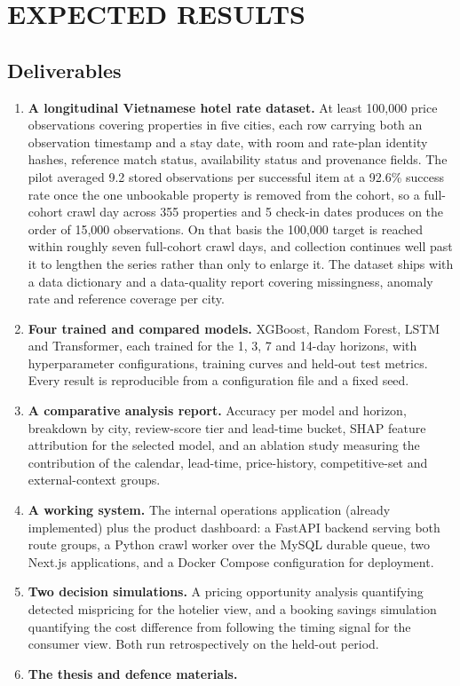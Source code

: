 \chapter{EXPECTED RESULTS}

\section{Deliverables}

\begin{enumerate}[leftmargin=*]
    \item \textbf{A longitudinal Vietnamese hotel rate dataset.} At least 100,000 price observations covering properties in five cities, each row carrying both an observation timestamp and a stay date, with room and rate-plan identity hashes, reference match status, availability status and provenance fields. The pilot averaged 9.2 stored observations per successful item at a 92.6\% success rate once the one unbookable property is removed from the cohort, so a full-cohort crawl day across 355 properties and 5 check-in dates produces on the order of 15,000 observations. On that basis the 100,000 target is reached within roughly seven full-cohort crawl days, and collection continues well past it to lengthen the series rather than only to enlarge it. The dataset ships with a data dictionary and a data-quality report covering missingness, anomaly rate and reference coverage per city.

    \item \textbf{Four trained and compared models.} XGBoost, Random Forest, LSTM and Transformer, each trained for the 1, 3, 7 and 14-day horizons, with hyperparameter configurations, training curves and held-out test metrics. Every result is reproducible from a configuration file and a fixed seed.

    \item \textbf{A comparative analysis report.} Accuracy per model and horizon, breakdown by city, review-score tier and lead-time bucket, SHAP feature attribution for the selected model, and an ablation study measuring the contribution of the calendar, lead-time, price-history, competitive-set and external-context groups.

    \item \textbf{A working system.} The internal operations application (already implemented) plus the product dashboard: a FastAPI backend serving both route groups, a Python crawl worker over the MySQL durable queue, two Next.js applications, and a Docker Compose configuration for deployment.

    \item \textbf{Two decision simulations.} A pricing opportunity analysis quantifying detected mispricing for the hotelier view, and a booking savings simulation quantifying the cost difference from following the timing signal for the consumer view. Both run retrospectively on the held-out period.

    \item \textbf{The thesis and defence materials.}
\end{enumerate}

